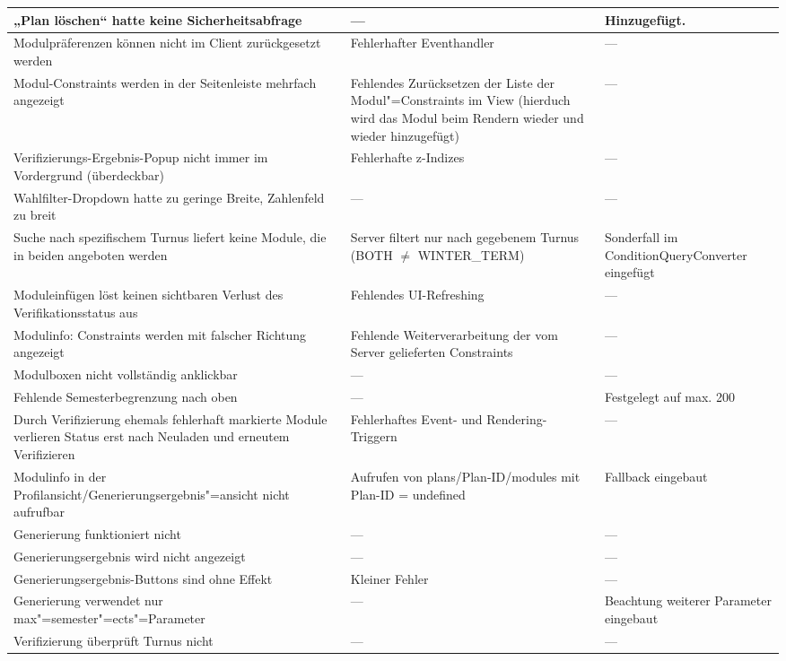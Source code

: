 \begin{longtable}{| >{\hspace{0pt}} p{} | >{\hspace{0pt}} p{} | >{\hspace{0pt}} p{} | }
	\hline
	„Plan löschen“ hatte keine Sicherheitsabfrage & --- & Hinzugefügt. \\
	\hline
	Modulpräferenzen können nicht im Client zurückgesetzt werden & Fehlerhafter Eventhandler & --- \\
	\hline
	Modul-Constraints werden in der Seitenleiste mehrfach angezeigt & Fehlendes Zurücksetzen der Liste der Modul"=Constraints im View (hierduch wird das Modul beim Rendern wieder und wieder hinzugefügt) & --- \\
	\hline
	Verifizierungs-Ergebnis-Popup nicht immer im Vordergrund (überdeckbar) & Fehlerhafte z-Indizes & --- \\
	\hline
	Wahlfilter-Dropdown hatte zu geringe Breite, Zahlenfeld zu breit & --- & --- \\
	\hline
	Suche nach spezifischem Turnus liefert keine Module, die in beiden angeboten werden & Server filtert nur nach gegebenem Turnus (BOTH $\neq$ WINTER\_TERM) & Sonderfall im ConditionQueryConverter eingefügt \\
	\hline
	Moduleinfügen löst keinen sichtbaren Verlust des Verifikationsstatus aus & Fehlendes UI-Refreshing & --- \\
	\hline
	Modulinfo: Constraints werden mit falscher Richtung angezeigt & Fehlende Weiterverarbeitung der vom Server gelieferten Constraints & --- \\
	\hline
	Modulboxen nicht vollständig anklickbar & ---  & --- \\
	\hline
	Fehlende Semesterbegrenzung nach oben & --- & Festgelegt auf max. 200 \\
	\hline
	Durch Verifizierung ehemals fehlerhaft markierte Module verlieren Status erst nach Neuladen und erneutem Verifizieren & Fehlerhaftes Event- und Rendering-Triggern & --- \\
	\hline
	Modulinfo in der Profilansicht/Generierungsergebnis"=ansicht nicht aufrufbar & Aufrufen von plans/Plan-ID/modules mit Plan-ID = undefined & Fallback eingebaut \\
	\hline
	Generierung funktioniert nicht & --- & --- \\
	\hline
	Generierungsergebnis wird nicht angezeigt & ---  & --- \\
	\hline
	Generierungsergebnis-Buttons sind ohne Effekt & Kleiner Fehler  & --- \\
	\hline
	Generierung verwendet nur max"=semester"=ects"=Parameter & --- & Beachtung weiterer Parameter eingebaut \\
	\hline
	Verifizierung überprüft Turnus nicht & --- & --- \\

\end{longtable}
